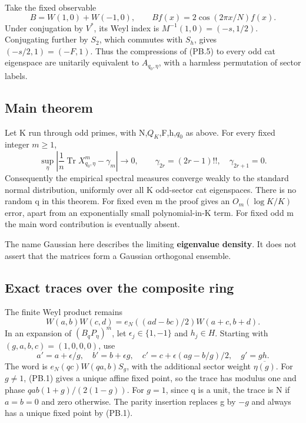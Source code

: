 Take the fixed observable \[
 B=W(1,0)+W(-1,0),\qquad Bf(x)=2\cos(2\pi x/N)f(x). \tag{PB.5}
\] Under conjugation by \(V^*\), its Weyl index is \(M^{-1}(1,0)=(-s,1/2)\). Conjugating further by \(S_2\), which commutes with \(S_h\), gives \((-s/2,1)=(-F,1)\). Thus the compressions of (PB.5) to every odd cat eigenspace are unitarily equivalent to \(A_{q_0,\eta}\), with a harmless permutation of sector labels.

\subsection{Main theorem}\label{pell_blocks:main-theorem}

\begin{theorem}\label{pass1:pell_blocks-1} Let K run through odd primes, with N,\(Q_{K}\),F,h,\(q_{0}\) as above. For every fixed integer \(m\geq1\), \[
 \sup_\eta\left|
 \frac1n\operatorname{Tr}X_{q_0,\eta}^{m}-\gamma_m
 \right|\longrightarrow0,
 \qquad
 \gamma_{2r}=(2r-1)!!,\quad\gamma_{2r+1}=0. \tag{PB.6}
\] Consequently the empirical spectral measures converge weakly to the standard normal distribution, uniformly over all K odd-sector cat eigenspaces. There is no random q in this theorem. For fixed even m the proof gives an \(O_{m}(\log K/K)\) error, apart from an exponentially small polynomial-in-K term. For fixed odd m the main word contribution is eventually absent.
\end{theorem}

The name Gaussian here describes the limiting \textbf{eigenvalue density}. It does not assert that the matrices form a Gaussian orthogonal ensemble.

\subsection{Exact traces over the composite ring}\label{pell_blocks:exact-traces-over-the-composite-ring}

The finite Weyl product remains \[
 W(a,b)W(c,d)=e_N((ad-bc)/2)W(a+c,b+d).
\] In an expansion of \((B_qP_\eta)^m\), let \(\epsilon_j\in\{1,-1\}\) and \(h_j\in H\). Starting with \((g,a,b,c)=(1,0,0,0)\), use \[
 a'=a+\epsilon/g,\quad b'=b+\epsilon g,\quad
 c'=c+\epsilon(ag-b/g)/2,\quad g'=gh. \tag{PB.7}
\] The word is \(e_N(qc)W(qa,b)S_g\), with the additional sector weight \(\overline{\eta(g)}\). For \(g\ne1\), (PB.1) gives a unique affine fixed point, so the trace has modulus one and phase \(qab(1+g)/(2(1-g))\). For \(g=1\), since q is a unit, the trace is N if \(a=b=0\) and zero otherwise. The parity insertion replaces g by \(-g\) and always has a unique fixed point by (PB.1).

